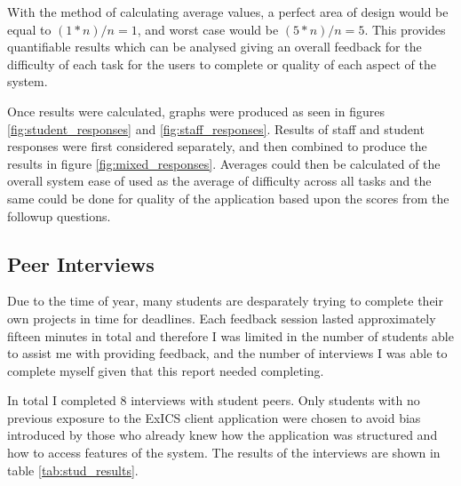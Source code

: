With the method of calculating average values, a perfect area of design would be equal to \((1*n)/n = 1\), and worst case would be \((5*n)/n = 5\).  This provides quantifiable results which can be analysed giving an overall feedback for the difficulty of each task for the users to complete or quality of each aspect of the system.

Once results were calculated, graphs were produced as seen in figures \ref{fig:student_responses} and \ref{fig:staff_responses}.  Results of staff and student responses were first considered separately, and then combined to produce the results in figure \ref{fig:mixed_responses}.  Averages could then be calculated of the overall system ease of used as the average of difficulty across all tasks and the same could be done for quality of the application based upon the scores from the followup questions.

\subsection{Peer Interviews}

Due to the time of year, many students are desparately trying to complete their own projects in time for deadlines.  Each feedback session lasted approximately fifteen minutes in total and therefore I was limited in the number of students able to assist me with providing feedback, and the number of interviews I was able to complete myself given that this report needed completing.

In total I completed 8 interviews with student peers.  Only students with no previous exposure to the ExICS client application were chosen to avoid bias introduced by those who already knew how the application was structured and how to access features of the system.  The results of the interviews are shown in table \ref{tab:stud_results}.

